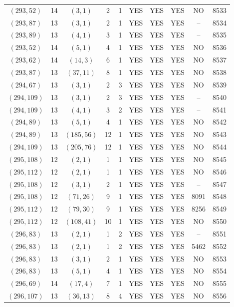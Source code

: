 \begin{longtable}{|c|c|c|c|c|c|c|c|c|c|}
$(293, 52)$ & 14 & $(3, 1)$ & 2 & 1 & YES & YES & YES & NO & 8533\\
$(293, 87)$ & 13 & $(3, 1)$ & 2 & 1 & YES & YES & YES & -- & 8534\\
$(293, 89)$ & 13 & $(4, 1)$ & 3 & 1 & YES & YES & YES & -- & 8535\\
$(293, 52)$ & 14 & $(5, 1)$ & 4 & 1 & YES & YES & YES & NO & 8536\\
$(293, 62)$ & 14 & $(14, 3)$ & 6 & 1 & YES & YES & YES & NO & 8537\\
$(293, 87)$ & 13 & $(37, 11)$ & 8 & 1 & YES & YES & YES & NO & 8538\\
$(294, 67)$ & 13 & $(3, 1)$ & 2 & 3 & YES & YES & YES & NO & 8539\\
$(294, 109)$ & 13 & $(3, 1)$ & 2 & 3 & YES & YES & YES & -- & 8540\\
$(294, 109)$ & 13 & $(4, 1)$ & 3 & 2 & YES & YES & YES & -- & 8541\\
$(294, 89)$ & 13 & $(5, 1)$ & 4 & 1 & YES & YES & YES & NO & 8542\\
$(294, 89)$ & 13 & $(185, 56)$ & 12 & 1 & YES & YES & YES & NO & 8543\\
$(294, 109)$ & 13 & $(205, 76)$ & 12 & 1 & YES & YES & YES & NO & 8544\\
$(295, 108)$ & 12 & $(2, 1)$ & 1 & 1 & YES & YES & YES & NO & 8545\\
$(295, 112)$ & 12 & $(2, 1)$ & 1 & 1 & YES & YES & YES & NO & 8546\\
$(295, 108)$ & 12 & $(3, 1)$ & 2 & 1 & YES & YES & YES & -- & 8547\\
$(295, 108)$ & 12 & $(71, 26)$ & 9 & 1 & YES & YES & YES & 8091 & 8548\\
$(295, 112)$ & 12 & $(79, 30)$ & 9 & 1 & YES & YES & YES & 8256 & 8549\\
$(295, 112)$ & 12 & $(108, 41)$ & 10 & 1 & YES & YES & YES & NO & 8550\\
$(296, 83)$ & 13 & $(2, 1)$ & 1 & 2 & YES & YES & YES & -- & 8551\\
$(296, 83)$ & 13 & $(2, 1)$ & 1 & 2 & YES & YES & YES & 5462 & 8552\\
$(296, 83)$ & 13 & $(3, 1)$ & 2 & 1 & YES & YES & YES & NO & 8553\\
$(296, 83)$ & 13 & $(5, 1)$ & 4 & 1 & YES & YES & YES & NO & 8554\\
$(296, 69)$ & 14 & $(17, 4)$ & 7 & 1 & YES & YES & YES & NO & 8555\\
$(296, 107)$ & 13 & $(36, 13)$ & 8 & 4 & YES & YES & YES & NO & 8556\\

\end{longtable}
